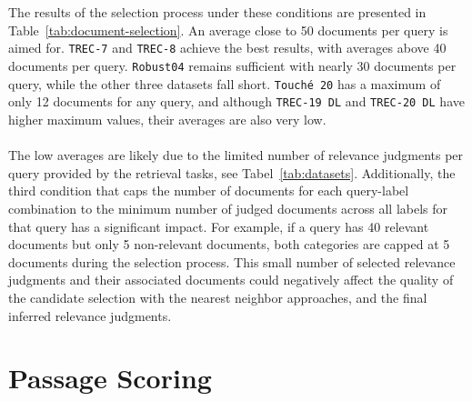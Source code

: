 \\\\
The results of the selection process under these conditions are presented in Table~\ref{tab:document-selection}. An average close to 50 documents per query is aimed for. \texttt{TREC-7} and \texttt{TREC-8} achieve the best results, with averages above 40 documents per query. \texttt{Robust04} remains sufficient with nearly 30 documents per query, while the other three datasets fall short. \texttt{Touché 20} has a maximum of only 12 documents for any query, and although \texttt{TREC-19 DL} and \texttt{TREC-20 DL} have higher maximum values, their averages are also very low.
\\\\
The low averages are likely due to the limited number of relevance judgments per query provided by the retrieval tasks, see Tabel~\ref{tab:datasets}. Additionally, the third condition that caps the number of documents for each query-label combination to the minimum number of judged documents across all labels for that query has a significant impact. For example, if a query has 40 relevant documents but only 5 non-relevant documents, both categories are capped at 5 documents during the selection process. This small number of selected relevance judgments and their associated documents could negatively affect the quality of the candidate selection with the nearest neighbor approaches, and the final inferred relevance judgments.
\pagebreak

\section{Passage Scoring}\label{eval-passage-scoring}

